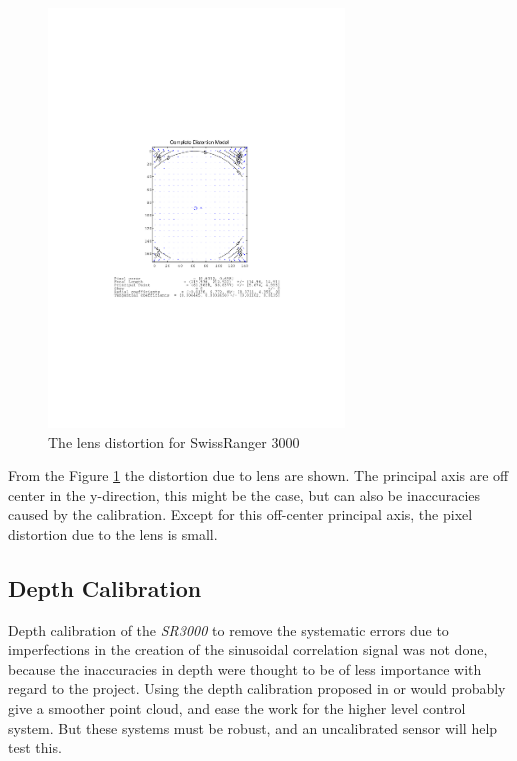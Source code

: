 \begin{figure}[htbp]
    \centering
    \includegraphics[width=0.7\textwidth]{pics/sr3000_comp_dist}
    \caption{The lens distortion for SwissRanger 3000}
    \label{chap3:fig-sr3000-comp-lensdist}
\end{figure}
From the Figure \ref{chap3:fig-sr3000-comp-lensdist} the distortion due to lens are shown.
The principal axis are off center in the y-direction, this might be the case, but can also
be inaccuracies caused by the calibration. Except for this off-center principal axis, the
pixel distortion due to the lens is small.


\subsection{Depth Calibration}
\label{chap3:subsec-depht-calib}
Depth calibration of the \emph{SR3000} to remove the systematic errors due to
imperfections in the creation of the sinusoidal correlation signal was not done, 
because the inaccuracies in depth
were thought to be of less importance with regard to the project. Using the depth
calibration proposed in \cite{sr3000} or \cite{tof-calibration} would probably give a
smoother point cloud, and ease the work for the higher level control system. But these
systems must be robust, and an uncalibrated sensor will help test this. 




